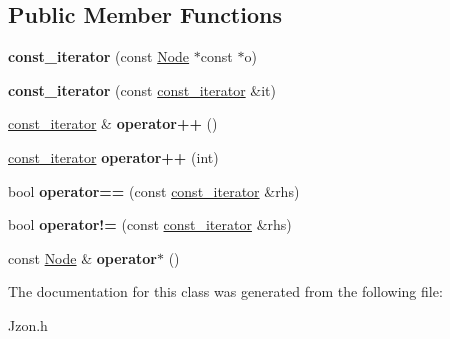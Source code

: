 \subsection*{Public Member Functions}
\begin{DoxyCompactItemize}
\item 
\hypertarget{class_jzon_1_1_array_1_1const__iterator_a2bbffaaa14e535d421f3c4740b498e96}{{\bfseries const\-\_\-iterator} (const \hyperlink{class_jzon_1_1_node}{Node} $\ast$const $\ast$o)}\label{class_jzon_1_1_array_1_1const__iterator_a2bbffaaa14e535d421f3c4740b498e96}

\item 
\hypertarget{class_jzon_1_1_array_1_1const__iterator_a9c609e7b864892d762028bf5662e2b77}{{\bfseries const\-\_\-iterator} (const \hyperlink{class_jzon_1_1_array_1_1const__iterator}{const\-\_\-iterator} \&it)}\label{class_jzon_1_1_array_1_1const__iterator_a9c609e7b864892d762028bf5662e2b77}

\item 
\hypertarget{class_jzon_1_1_array_1_1const__iterator_a14556ac47733ee2a169723f8c5f857be}{\hyperlink{class_jzon_1_1_array_1_1const__iterator}{const\-\_\-iterator} \& {\bfseries operator++} ()}\label{class_jzon_1_1_array_1_1const__iterator_a14556ac47733ee2a169723f8c5f857be}

\item 
\hypertarget{class_jzon_1_1_array_1_1const__iterator_a8750d9d1c20a428c98a81016e4176038}{\hyperlink{class_jzon_1_1_array_1_1const__iterator}{const\-\_\-iterator} {\bfseries operator++} (int)}\label{class_jzon_1_1_array_1_1const__iterator_a8750d9d1c20a428c98a81016e4176038}

\item 
\hypertarget{class_jzon_1_1_array_1_1const__iterator_a4dfffc8199966670a94474402cf5c2b6}{bool {\bfseries operator==} (const \hyperlink{class_jzon_1_1_array_1_1const__iterator}{const\-\_\-iterator} \&rhs)}\label{class_jzon_1_1_array_1_1const__iterator_a4dfffc8199966670a94474402cf5c2b6}

\item 
\hypertarget{class_jzon_1_1_array_1_1const__iterator_afcb4d476dc47c9929ab515495dae28ad}{bool {\bfseries operator!=} (const \hyperlink{class_jzon_1_1_array_1_1const__iterator}{const\-\_\-iterator} \&rhs)}\label{class_jzon_1_1_array_1_1const__iterator_afcb4d476dc47c9929ab515495dae28ad}

\item 
\hypertarget{class_jzon_1_1_array_1_1const__iterator_a2d09cd26c9513ecc6db75acdce095e69}{const \hyperlink{class_jzon_1_1_node}{Node} \& {\bfseries operator$\ast$} ()}\label{class_jzon_1_1_array_1_1const__iterator_a2d09cd26c9513ecc6db75acdce095e69}

\end{DoxyCompactItemize}


The documentation for this class was generated from the following file\-:\begin{DoxyCompactItemize}
\item 
Jzon.\-h\end{DoxyCompactItemize}
